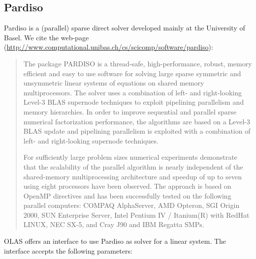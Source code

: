 \subsection{Pardiso}
\label{sec:Pardiso}
%
%
Pardiso is a (parallel) sparse direct solver developed mainly at the University
of Basel. We cite the web-page
(\url{http://www.computational.unibas.ch/cs/scicomp/software/pardiso}):
%
%
\begin{quote}
The package PARDISO is a thread-safe, high-performance, robust, memory efficient
and easy to use software for solving large sparse symmetric and unsymmetric
linear systems of equations on shared memory multiprocessors. The solver uses a
combination of left- and right-looking Level-3 BLAS supernode techniques to
exploit pipelining parallelism and memory hierarchies. In order to improve
sequential and parallel sparse numerical factorization performance, the
algorithms are based on a Level-3 BLAS update and pipelining parallelism is
exploited with a combination of left- and right-looking supernode techniques.

For sufficiently large problem sizes numerical experiments demonstrate that the
scalability of the parallel algorithm is nearly independent of the shared-memory
multiprocessing architecture and speedup of up to seven using eight processors
have been observed. The approach is based on OpenMP directives and has been
successfully tested on the following parallel computers: COMPAQ AlphaServer, AMD
Opteron, SGI Origin 2000, SUN Enterprise Server, Intel Pentium IV / Itanium(R)
with RedHat LINUX, NEC SX-5, and Cray J90 and IBM Regatta SMPs.
\end{quote}
%
%
OLAS offers an interface to use Pardiso as solver for a linear system. The
interface accepts the following parameters:
%
%
